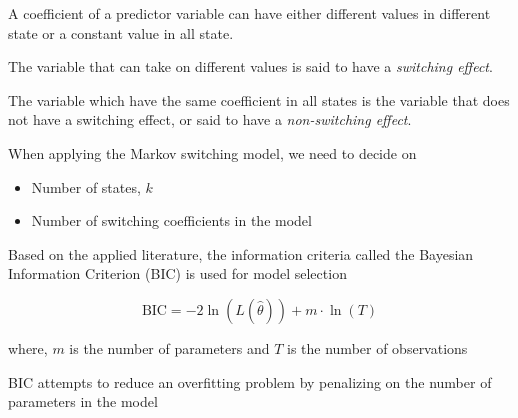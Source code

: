 \documentclass{beamer}
\begin{document}
\begin{frame}
A coefficient of a predictor variable can have either different values in different state or a constant value in all state. 

\vspace{1em}

The variable that can take on different values is said to have a \textit{switching effect}. 

\vspace{1em}

The variable which have the same coefficient in all states is the variable that does not have a switching effect, or said to have a \textit{non-switching effect}. 
\end{frame}

\begin{frame}
When applying the Markov switching model, we need to decide on
\begin{itemize}
	\item Number of states, $k$
	\item Number of switching coefficients in the model
\end{itemize}
\vspace{1em}

Based on the applied literature, the information criteria called the Bayesian Information Criterion (BIC) is used for model selection

$$\mathrm{BIC}=-2\ln(L(\hat{\theta}))+m\cdot\ln(T)$$

\footnotesize{where, $m$ is the number of parameters and $T$ is the number of observations}
\vspace{1em}

\normalsize{BIC attempts to reduce an overfitting problem by penalizing on the number of parameters in the model}

\end{frame}

\end{document}
